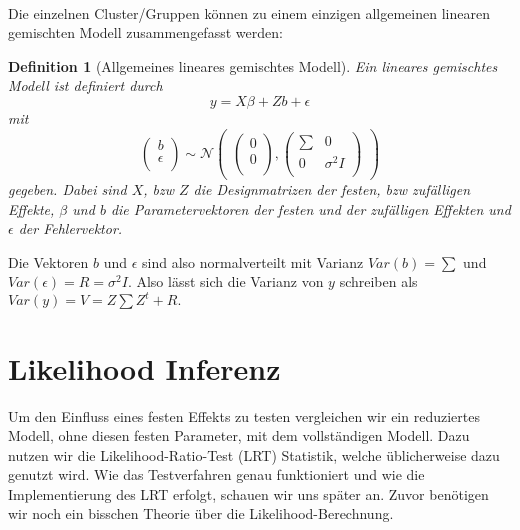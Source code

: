 \documentclass[%
thesis=student,%
coverpage=false,%
titlepage=false,%
headmarks=true, %
german,%
font=libertine, %
math=newpxtx, %
BCOR=5mm,%
coverBCOR=11mm%
]{tumbook}
\theoremstyle{break}
\newtheorem{definition}{Definition}[section]
\begin{document}
\\
Die einzelnen Cluster/Gruppen können zu einem einzigen allgemeinen linearen gemischten Modell zusammengefasst werden:
\begin{definition}[Allgemeines lineares gemischtes Modell]
	Ein lineares gemischtes Modell ist definiert durch
	$$y = X\beta + Zb + \epsilon $$
	mit $$\begin{pmatrix}
		b \\
		\epsilon \\
	\end{pmatrix}
	\sim
	\mathcal{N}
	\begin{pmatrix}
		\begin{pmatrix}
			
			0 \\
			0 \\
		\end{pmatrix},
		\begin{pmatrix}
			\sum & 0 \\
			0 & \sigma^2I \\
		\end{pmatrix}
	\end{pmatrix}$$
	gegeben. Dabei sind $X$, bzw $Z$ die Designmatrizen der festen, bzw zufälligen Effekte, $\beta$ und $b$ die Parametervektoren der festen und der zufälligen Effekten und $\epsilon$ der Fehlervektor.
\end{definition}\noindent
Die Vektoren $b$ und $\epsilon$ sind also normalverteilt mit Varianz $Var(b) = \sum$ und $Var(\epsilon) = R = \sigma^2I$. Also lässt sich die Varianz von $y$ schreiben als $Var(y) = V = Z \sum Z^t + R.$
\section{Likelihood Inferenz}
Um den Einfluss eines festen Effekts zu testen vergleichen wir ein reduziertes Modell, ohne diesen festen Parameter, mit dem vollständigen Modell. Dazu nutzen wir die Likelihood-Ratio-Test (LRT) Statistik, welche üblicherweise dazu genutzt wird. Wie das Testverfahren genau funktioniert und wie die Implementierung des LRT erfolgt, schauen wir uns später an. Zuvor benötigen wir noch ein bisschen Theorie über die Likelihood-Berechnung. 
\end{document}
